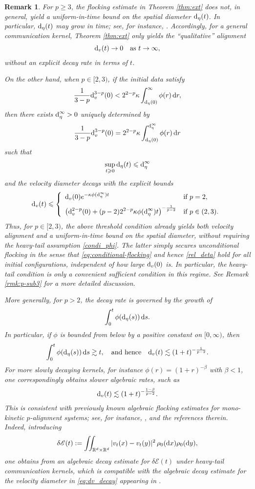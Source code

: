 \documentclass[10pt,reqno]{amsart}
\newcommand{\delE}{\delta{\mathscr E}}
\renewcommand{\geq}{\geqslant}
\renewcommand{\ge}{\geqslant}
\renewcommand{\leq}{\leqslant}
\numberwithin{equation}{section}
\newtheorem{remark}{Remark}[section]
\newcommand{\R}{\mathbb R}
\newcommand{\bq}{\begin{equation}}
\newcommand{\eq}{\end{equation}}
\newcommand{\lt}{\left}
\newcommand{\rt}{\right}
\newcommand{\intrr}{\iint_{\R^d \times \R^d}}
\newcommand{\rd}{\textnormal{d}}
\newcommand{\dx}{\textnormal{d}x}
\newcommand{\dr}{\textnormal{d}r}
\newcommand{\dy}{\textnormal{d}y}
\newcommand{\ds}{\textnormal{d}s}
\begin{document}
\begin{remark}
For $p\ge3$, the flocking estimate in Theorem \ref{thm:ext} does not, in general, yield a uniform-in-time bound on the spatial diameter $\rd_\eta(t)$. In particular, $\rd_\eta(t)$ may grow in time; see, for instance, \cite{BT24,NSTpre}. Accordingly, for a general communication kernel, Theorem \ref{thm:ext} only yields the ``qualitative'' alignment
\[
\rd_v(t)\to0 \quad\text{as }t\to\infty,
\]
without an explicit decay rate in terms of $t$.



On the other hand, when $p \in [2,3)$, if the initial data satisfy
  \bq\label{eq:conditional-flocking}
\frac1{3-p} \rd_v^{3-p}(0) <  2^{2-p}\kappa \int_{\rd_\eta(0)}^\infty \phi(r)\,\dr,
 \eq
 then there exists $\rd_\eta^\infty > 0$ uniquely determined by
 \bq\label{rel_deta}
\frac1{3-p} \rd_v^{3-p}(0) =  2^{2-p}\kappa \int_{\rd_\eta(0)}^{\rd_\eta^\infty} \phi(r)\,\dr
 \eq
such that
\[
\sup_{t \geq 0} \rd_\eta(t) \leq \rd_\eta^\infty
\]
and the velocity diameter decays with the explicit bounds 
 \bq\label{decay_v_sub3}
\rd_v(t) \leq  \left\{ \begin{array}{ll}
\displaystyle \rd_v(0) e^{- \kappa \phi(\rd_\eta^\infty) t} & \textrm{if $p=2$},\\[2mm]
\displaystyle  \lt(\rd_v^{2-p}(0) + (p-2) 2^{2-p} \kappa \phi(\rd_\eta^\infty) t \rt)^{-\frac1{p-2}}& \textrm{if $p\in(2,3)$}.
  \end{array} \right.
 \eq
Thus, for $p\in[2,3)$, the above threshold condition already yields both velocity alignment and a uniform-in-time bound on the spatial diameter, without requiring the heavy-tail assumption \eqref{condi_phi}. The latter simply secures \emph{unconditional flocking} in the sense that \eqref{eq:conditional-flocking} and hence \eqref{rel_deta} hold for all initial configurations, independent of how large $\rd_v(0)$ is. In particular, the heavy-tail condition is only a convenient sufficient condition in this regime. See Remark \ref{rmk:p-sub3} for a more detailed discussion.
 
More generally, for $p>2$, the decay rate is governed by the growth of
\[
\int_0^t \phi(\rd_\eta(s))\,\ds.
\]
In particular, if $\phi$ is bounded from below by a positive constant on $[0,\infty)$, then
\[
\int_0^t \phi(\rd_\eta(s))\,\ds \gtrsim t,
\quad\text{and hence}\quad
\rd_v(t)\lesssim (1+t)^{-\frac1{p-2}}.
\]
For more slowly decaying kernels, for instance $\phi(r)=(1+r)^{-\beta}$ with $\beta<1$, one correspondingly obtains slower algebraic rates, such as
\begin{equation}\label{eq:dv_decay}
\rd_v(t)\lesssim (1+t)^{-\frac{1-\beta}{p-2}}.
\end{equation}
This is consistent with previously known algebraic flocking estimates for mono-kinetic $p$-alignment systems; see, for instance, \cite{Tad23, NSTpre}, and the references therein. Indeed, introducing
\[
\delE(t):=\intrr |v_t(x)-v_t(y)|^2\,\rho_0(\dx)\rho_0(\dy),
\]
one obtains from \cite[Proposition 5.2]{Tad23} an algebraic decay estimate for $\delE(t)$ under heavy-tail communication kernels, which is compatible with the algebraic decay estimate for the velocity diameter in \eqref{eq:dv_decay} appearing in \cite{NSTpre}.
\end{remark}
\end{document}
